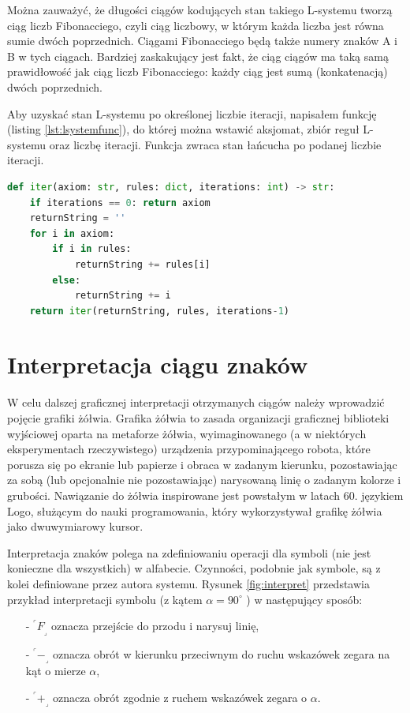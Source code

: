 \documentclass[a4paper,twoside,12pt]{report}
\def\crnrs#1{$^\ulcorner#1_\lrcorner$}
\begin{document}
Można zauważyć, że długości ciągów kodujących stan takiego L-systemu tworzą ciąg liczb Fibonacciego,
czyli ciąg liczbowy, w którym każda liczba jest równa sumie dwóch
poprzednich. Ciągami Fibonacciego będą także numery znaków A i B
w tych ciągach. Bardziej zaskakujący jest fakt, że ciąg ciągów ma
taką samą prawidłowość jak ciąg liczb Fibonacciego: każdy ciąg jest sumą
(konkatenacją) dwóch poprzednich.

Aby uzyskać stan L-systemu po określonej liczbie iteracji, 
napisałem funkcję (listing \ref{lst:lsystemfunc}), do której można wstawić aksjomat, 
zbiór reguł L-systemu oraz liczbę iteracji. 
Funkcja zwraca stan łańcucha po podanej liczbie iteracji.

\begin{lstlisting}[language=Python, caption={Funkcja, która zwraca stan systemu po określonej liczbie iteracji}, label={lst:lsystemfunc}]
def iter(axiom: str, rules: dict, iterations: int) -> str:
	if iterations == 0: return axiom
	returnString = ''
	for i in axiom:
		if i in rules:
			returnString += rules[i]
		else:
			returnString += i
	return iter(returnString, rules, iterations-1)
\end{lstlisting}


\section{Interpretacja ciągu znaków}

W celu dalszej graficznej interpretacji otrzymanych ciągów
należy wprowadzić pojęcie grafiki żółwia. Grafika żółwia
to zasada organizacji graficznej biblioteki wyjściowej oparta 
na metaforze żółwia, wyimaginowanego 
(a w niektórych eksperymentach rzeczywistego) urządzenia 
przypominającego robota, które porusza się po ekranie 
lub papierze i obraca w zadanym kierunku, 
pozostawiając za sobą (lub opcjonalnie nie pozostawiając) 
narysowaną linię o zadanym kolorze i grubości.
Nawiązanie do żółwia inspirowane jest powstałym w latach 60. 
językiem Logo, służącym do nauki programowania, 
który wykorzystywał grafikę żółwia jako dwuwymiarowy kursor.


Interpretacja znaków polega na zdefiniowaniu operacji dla symboli
(nie jest konieczne dla wszystkich) w alfabecie. Czynności, podobnie 
jak symbole, są z kolei definiowane
przez autora systemu. Rysunek \ref{fig:interpret} przedstawia przykład interpretacji
symbolu (z kątem $\alpha = 90^\circ$ ) w następujący sposób:

\begin{itemize}
	\item[-] \crnrs{F} oznacza przejście do przodu i narysuj linię,
	\item[-] \crnrs{-} oznacza obrót w kierunku przeciwnym do ruchu wskazówek zegara na kąt o mierze $\alpha$,
	\item[-] \crnrs{+} oznacza obrót zgodnie z ruchem wskazówek zegara o $\alpha$.
\end{itemize}
\end{document}
